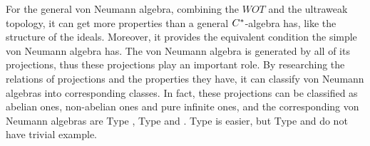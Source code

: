 For the general von Neumann algebra, combining the $WOT$ and the ultraweak topology, it can get more properties than a general $C^{*}$-algebra has, like the structure of the ideals. Moreover, it provides the equivalent condition the simple von Neumann algebra has. The von Neumann algebra is generated by all of its projections, thus these projections play an important role. By researching the relations of projections and the properties they have, it can classify von Neumann algebras into corresponding classes. In fact, these projections can be classified as abelian ones, non-abelian ones and pure infinite ones, and the corresponding von Neumann algebras are Type , Type  and . Type  is easier, but Type  and  do not have trivial example.
